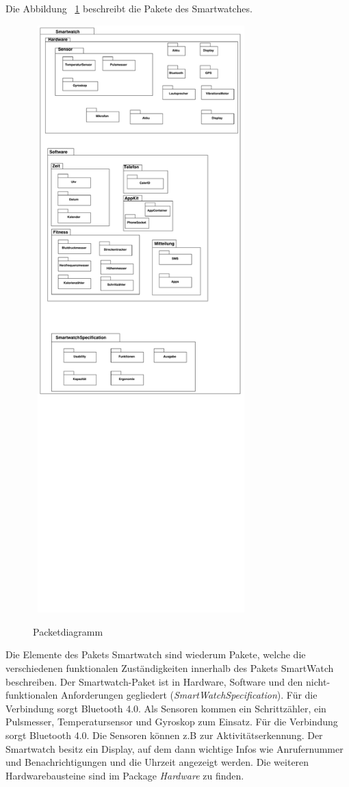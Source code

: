 Die Abbildung ~\ref{fig:package} beschreibt die Pakete des Smartwatches.
\begin{figure}[H]
\centering\
\includegraphics[width=8cm]{img/package}
\caption{Packetdiagramm}\label{fig:package}
\end{figure}

Die Elemente des Pakets Smartwatch sind wiederum Pakete, welche die verschiedenen funktionalen Zuständigkeiten innerhalb des Pakets SmartWatch beschreiben.
Der Smartwatch-Paket ist in Hardware, Software und den nicht-funktionalen Anforderungen
gegliedert (\textit{SmartWatchSpecification}).
Für die Verbindung sorgt Bluetooth 4.0.
Als Sensoren kommen ein Schrittzähler, ein Pulsmesser, Temperatursensor und Gyroskop zum Einsatz. Für die Verbindung sorgt Bluetooth 4.0.
Die Sensoren können z.B zur Aktivitätserkennung.
Der Smartwatch besitz ein Display, auf dem dann wichtige Infos wie Anrufernummer und Benachrichtigungen und die Uhrzeit angezeigt werden.
Die weiteren Hardwarebausteine sind im Package \textit{Hardware} zu finden.

